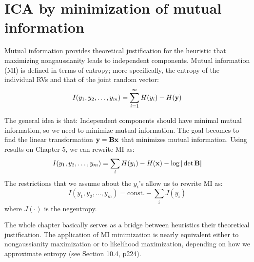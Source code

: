 \documentclass[a4paper, one	side]{book}
\begin{document}

\chapter{ICA by minimization of mutual information}
Mutual information provides theoretical justification for the heuristic that maximizing nongaussianity leads to independent components. Mutual information (MI) is defined in terms of entropy; more specifically, the entropy of the individual RVs and that of the joint random vector: %
$$ I(y_1,y_2,\hdots,y_m) = \sum\limits_{i=1}^{m} H(y_i) - H(\mathbf y) $$

The general idea is that: Independent components should have minimal mutual information, so we need to minimize mutual information. The goal becomes to find the linear transformation $\mathbf{y=Bx}$ that minimizes mutual information. Using results on Chapter 5, we can rewrite MI as:%
$$ I(y_1, y_2, \hdots, y_m) = \sum_i H(y_i) - H(\mathbf x) - \log |\det \mathbf B| $$
%
The restrictions that we assume about the $y_i$'s allow us to rewrite MI as:
$$ I(y_1, y_2, \hdots, y_m) = \text{const.} - \sum_i J(y_i)  $$
where $J(\cdot)$ is the negentropy. 

The whole chapter basically serves as a bridge between heuristics their theoretical justification. The application of MI minimization is nearly equivalent either to nongaussianity maximization or to likelihood maximization, depending on how we approximate entropy (see Section 10.4, p224).
\\
\end{document}
